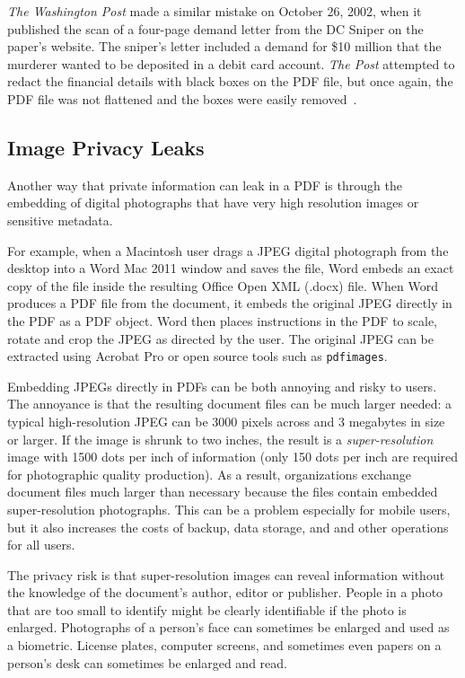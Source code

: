 \emph{The Washington Post} made a similar mistake on October 26, 2002,
when it published the scan of a four-page demand letter from the DC
Sniper on the paper's website. The sniper's letter included a demand
for \$10 million that the murderer wanted to be deposited in a debit
card account. \emph{The Post} attempted to redact
the financial details with black boxes on the PDF file, but once
again, the PDF file was not flattened and the boxes were easily removed~\cite[p.152]{internet-forensics}.

\subsection{Image Privacy Leaks}

Another way that private information can leak in a PDF is through the
embedding of digital photographs that have very high resolution images or
sensitive metadata.

For example, when a Macintosh user drags a JPEG digital photograph from
the desktop into a Word Mac 2011 window and saves the file, Word embeds an
exact copy of the file inside the resulting Office Open XML (.docx)
file. When Word produces a PDF file from the document, it embeds the
original JPEG directly in the PDF as a PDF object. Word then places
instructions in the PDF to scale, rotate and crop the JPEG as directed
by the user. The original JPEG can be extracted using Acrobat Pro or open source
tools such as \texttt{pdfimages}. 

Embedding JPEGs directly in PDFs
can be both annoying and  risky to
users. The annoyance is that the resulting document files  can
be much larger needed: a typical high-resolution JPEG
can be 3000 pixels across and 3
megabytes in size or larger. If the image is shrunk  to two
inches, the result is a \emph{super-resolution} image with 1500 dots
per inch of information (only 150 dots per inch are required for
photographic quality production). As a result,  organizations exchange
document files  much larger than necessary because the files
contain embedded super-resolution photographs. This can be a
problem especially for mobile users, but it also increases the costs of backup,
data storage, and and other operations for all users.

The privacy risk is that super-resolution images can reveal information
without the knowledge of the document's author, editor or
publisher. People in a photo that are too small to identify might be
clearly identifiable if the photo is enlarged. Photographs of a
person's face can sometimes be enlarged and used as a
biometric. License plates, computer screens, and sometimes even papers
on a person's desk can sometimes be enlarged and read. 

